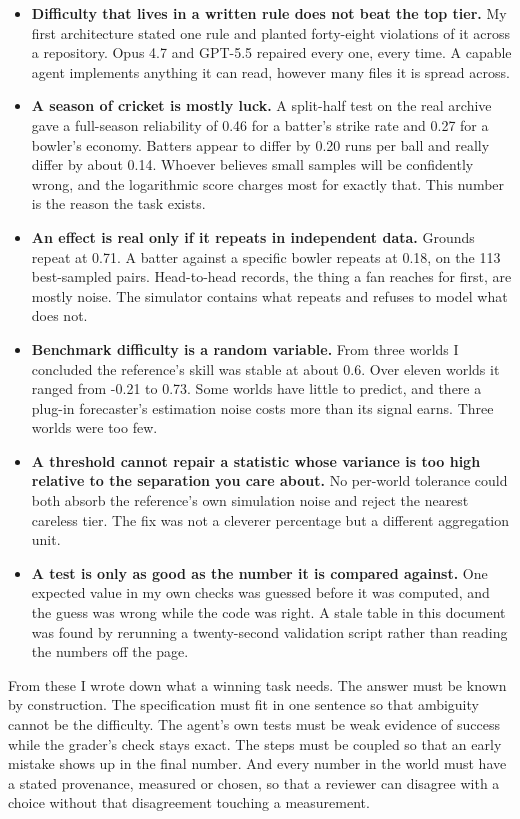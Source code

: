 \documentclass[11pt,letterpaper]{article}
\begin{document}
\begin{itemize}[leftmargin=1.4em, itemsep=2pt]
\item \textbf{Difficulty that lives in a written rule does not beat the top tier.} My first architecture stated one rule and planted forty-eight violations of it across a repository. Opus 4.7 and GPT-5.5 repaired every one, every time. A capable agent implements anything it can read, however many files it is spread across.
\item \textbf{A season of cricket is mostly luck.} A split-half test on the real archive gave a full-season reliability of 0.46 for a batter's strike rate and 0.27 for a bowler's economy. Batters appear to differ by 0.20 runs per ball and really differ by about 0.14. Whoever believes small samples will be confidently wrong, and the logarithmic score charges most for exactly that. This number is the reason the task exists.
\item \textbf{An effect is real only if it repeats in independent data.} Grounds repeat at 0.71. A batter against a specific bowler repeats at 0.18, on the 113 best-sampled pairs. Head-to-head records, the thing a fan reaches for first, are mostly noise. The simulator contains what repeats and refuses to model what does not.
\item \textbf{Benchmark difficulty is a random variable.} From three worlds I concluded the reference's skill was stable at about 0.6. Over eleven worlds it ranged from -0.21 to 0.73. Some worlds have little to predict, and there a plug-in forecaster's estimation noise costs more than its signal earns. Three worlds were too few.
\item \textbf{A threshold cannot repair a statistic whose variance is too high relative to the separation you care about.} No per-world tolerance could both absorb the reference's own simulation noise and reject the nearest careless tier. The fix was not a cleverer percentage but a different aggregation unit.
\item \textbf{A test is only as good as the number it is compared against.} One expected value in my own checks was guessed before it was computed, and the guess was wrong while the code was right. A stale table in this document was found by rerunning a twenty-second validation script rather than reading the numbers off the page.
\end{itemize}

From these I wrote down what a winning task needs. The answer must be known by construction. The specification must fit in one sentence so that ambiguity cannot be the difficulty. The agent's own tests must be weak evidence of success while the grader's check stays exact. The steps must be coupled so that an early mistake shows up in the final number. And every number in the world must have a stated provenance, measured or chosen, so that a reviewer can disagree with a choice without that disagreement touching a measurement.
\end{document}
